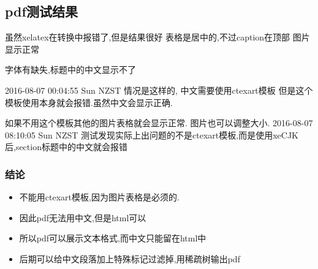 \documentclass[11pt]{article}
\begin{document}
\subsection{pdf测试结果}
\label{sec:orgheadline10}
虽然xelatex在转换中报错了,但是结果很好
表格是居中的,不过caption在顶部
图片显示正常

字体有缺失,标题中的中文显示不了

2016-08-07 00:04:55 Sun NZST
情况是这样的,
中文需要使用ctexart模板
但是这个模板使用本身就会报错.虽然中文会显示正确.

如果不用这个模板其他的图片表格就会显示正常.
图片也可以调整大小.
2016-08-07 08:10:05 Sun NZST
测试发现实际上出问题的不是ctexart模板,而是使用xeCJK后,section标题中的中文就会报错
\subsubsection{结论}
\label{sec:orgheadline9}
\begin{itemize}
\item 不能用ctexart模板,因为图片表格是必须的.
\item 因此pdf无法用中文,但是html可以
\item 所以pdf可以展示文本格式,而中文只能留在html中
\item 后期可以给中文段落加上特殊标记过滤掉,用稀疏树输出pdf
\end{itemize}
\end{document}
